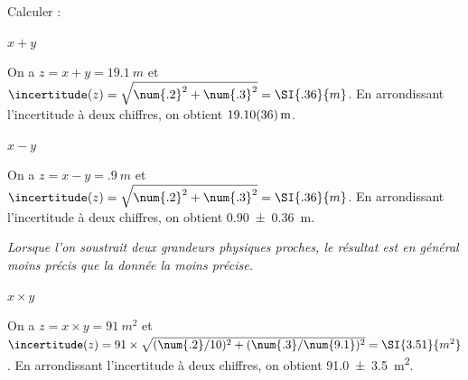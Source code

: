 Calculer : 

\debutEntrainement


\begin{enonce}
$x+y$
\end{enonce}


\begin{corrige}
On a $z=x+y=\SI{19.1}{m}$ et $\incertitude(z)=\sqrt{\num{.2}^2+\num{.3}^2}=\SI{.36}{m}$. En arrondissant l'incertitude à deux chiffres, on obtient $\SI{19.10\pm0.36}{m}$.
\end{corrige}



\begin{enonce}
$x-y$
\end{enonce}


\begin{corrige}
On a $z=x-y=\SI{.9}{m}$ et $\incertitude(z)=\sqrt{\num{.2}^2+\num{.3}^2}=\SI{.36}{m}$. En arrondissant l'incertitude à deux chiffres, on obtient \SI{.90\pm0.36}{m}.
		
{\itshape Lorsque l'on soustrait deux grandeurs physiques proches, le résultat est en général moins précis que la donnée la moins précise.}
\end{corrige}



\begin{enonce}
$x\times y$
\end{enonce}


\begin{corrige}
On a $z=x\times y=\SI{91}{m^2}$ et $\incertitude(z)=91\times \sqrt{(\num{.2}/10)^2+(\num{.3}/\num{9.1})^2}=\SI{3.51}{m^2}$. En arrondissant l'incertitude à deux chiffres, on obtient \SI{91.0\pm3.5}{m^2}.
\end{corrige}

